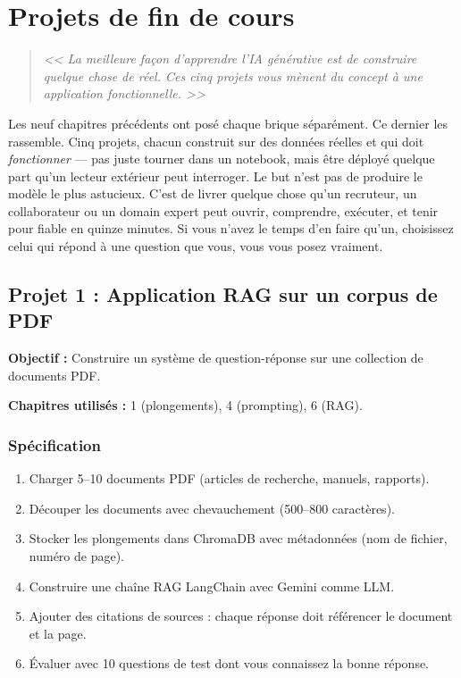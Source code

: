 \chapter{Projets de fin de cours}
\label{ch:capstone}

\begin{quote}
\emph{<< La meilleure fa\c{c}on d'apprendre l'IA g\'en\'erative est de construire quelque chose de r\'eel. Ces cinq projets vous m\`enent du concept \`a une application fonctionnelle. >>}
\end{quote}

Les neuf chapitres précédents ont posé chaque brique séparément. Ce dernier les rassemble. Cinq projets, chacun construit sur des données réelles et qui doit \emph{fonctionner} --- pas juste tourner dans un notebook, mais être déployé quelque part qu'un lecteur extérieur peut interroger. Le but n'est pas de produire le modèle le plus astucieux. C'est de livrer quelque chose qu'un recruteur, un collaborateur ou un domain expert peut ouvrir, comprendre, exécuter, et tenir pour fiable en quinze minutes. Si vous n'avez le temps d'en faire qu'un, choisissez celui qui répond à une question que vous, vous vous posez vraiment.
\section{Projet 1 : Application RAG sur un corpus de PDF}

\textbf{Objectif :} Construire un syst\`eme de question-r\'eponse sur une collection de documents PDF.

\textbf{Chapitres utilis\'es :} 1 (plongements), 4 (prompting), 6 (RAG).

\subsection{Sp\'ecification}

\begin{enumerate}
  \item Charger 5--10 documents PDF (articles de recherche, manuels, rapports).
  \item D\'ecouper les documents avec chevauchement (500--800 caract\`eres).
  \item Stocker les plongements dans ChromaDB avec m\'etadonn\'ees (nom de fichier, num\'ero de page).
  \item Construire une cha\^ine RAG LangChain avec Gemini comme LLM.
  \item Ajouter des citations de sources : chaque r\'eponse doit r\'ef\'erencer le document et la page.
  \item \'Evaluer avec 10 questions de test dont vous connaissez la bonne r\'eponse.
\end{enumerate}

